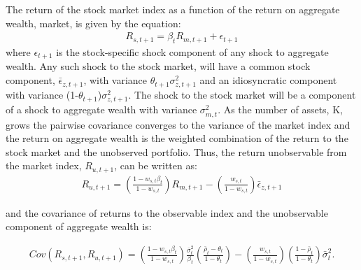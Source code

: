 The return of the stock market index as a function of the return on aggregate wealth, market, is given by the equation:
\begin{align*}
R_{s,t+1} = \beta_{t}R_{m,t+1} + \epsilon_{t+1}
\end{align*}
where $\epsilon_{t+1}$ is the stock-specific shock component of any shock to aggregate wealth. Any such shock to the stock market, will have a common stock component, $\bar{\epsilon}_{z,t+1}$, with variance $\theta_{t+1}\sigma^{2}_{z,t+1}$ and an idiosyncratic component with variance (1-$\theta_{t+1}$)$\sigma^{2}_{z,t+1}$. The shock to the stock market will be a component of a shock to aggregate wealth with variance $\sigma^{2}_{m,t}$. As the number of assets, K, grows the pairwise covariance converges to the variance of the market index and the return on aggregate wealth is the weighted combination of the return to the stock market and the unobserved portfolio. Thus, the return unobservable from the market index, $R_{u,t+1}$, can be written as:
\begin{align*}
R_{u,t+1} = \left(\frac{1-w_{s,t}\beta_{t}}{1-w_{s,t}}\right)R_{m,t+1} - \left(\frac{w_{s,t}}{1-w_{s,t}}\right)\bar{\epsilon}_{z,t+1}
\end{align*}

and the covariance of returns to the observable index and the unobservable component of aggregate wealth is:

\begin{align*}
Cov(R_{s,t+1},R_{u,t+1}) = \left(\frac{1-w_{s,t}\beta_{t}}{1-w_{s,t}}\right)\frac{\bar{\sigma}^{2}_{t}}{\beta_{t}}\left(\frac{\bar{\rho}_{t}-\theta_{t}}{1-\theta_{t}}\right) - \left(\frac{w_{s,t}}{1-w_{s,t}}\right)\left(\frac{1-\bar{\rho}_{t}}{1-\theta_{t}}\right)\bar{\sigma}^{2}_{t}.
\end{align*}


